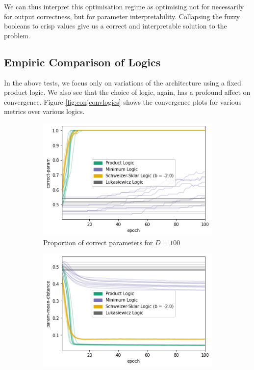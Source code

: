 We can thus interpret this optimisation regime as optimising not for necessarily for output correctness, but for parameter interpretability. Collapsing the fuzzy booleans to crisp values give us a correct and interpretable solution to the problem.

\subsection{Empiric Comparison of Logics}

In the above tests, we focus only on variations of the architecture using a fixed product logic. We also see that the choice of logic, again, has a profound affect on convergence. Figure \ref{fig:conjconvlogics} shows the convergence plots for various metrics over various logics.

\begin{figure}[h]
    \centering
    \begin{subfigure}[t]{0.45\textwidth}
        \centering
        \includegraphics[width=\textwidth]{imgs/conj-cp-100dim-keep50-5t.png}
        \caption{Proportion of correct parameters for $D=100$}
        \label{fig:conjconvcpd100}
    \end{subfigure}
    \begin{subfigure}[t]{0.45\textwidth}
        \centering
        \includegraphics[width=\textwidth]{imgs/conj-pmd-100dim-keep50-5t.png}

\end{subfigure}
\end{figure}
